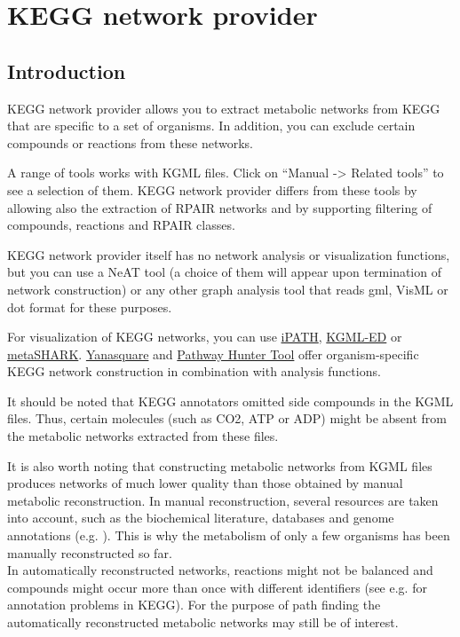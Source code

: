 \chapter{KEGG network provider}

\section{Introduction}

KEGG network provider allows you to extract metabolic networks from KEGG \cite{Kanehisa2008} that are specific to a set of organisms.
In addition, you can exclude certain compounds or reactions from these networks.

A range of tools works with KGML files. Click on ``Manual -> Related tools'' to see a selection of them.
KEGG network provider differs from these tools by allowing also the extraction of RPAIR networks and by supporting
filtering of compounds, reactions and RPAIR classes.

KEGG network provider itself has no network analysis or visualization functions,
but you can use a NeAT tool (a choice of them will appear upon termination of network construction)
or any other graph analysis tool that reads gml, VisML or dot format for these purposes.

For visualization of KEGG networks, you can use \href{http://pathways.embl.de/index.html}{iPATH},
\href{http://kgml-ed.ipk-gatersleben.de/Introduction.html}{KGML-ED} or
\href{http://bioinformatics.leeds.ac.uk:8080/shark/user}{metaSHARK}.
\href{http://yana.bioapps.biozentrum.uni-wuerzburg.de/}{Yanasquare} and
\href{http://pht.tu-bs.de/PHT/}{Pathway Hunter Tool} offer
organism-specific KEGG network construction in combination
with analysis functions.

It should be noted that KEGG annotators omitted side compounds in the KGML files. Thus, certain molecules
(such as CO2, ATP or ADP) might be absent from the metabolic networks extracted from these files.

It is also worth noting that constructing metabolic networks from KGML files produces networks of much lower quality
than those obtained by manual metabolic reconstruction. In manual reconstruction, several resources are taken into account,
such as the biochemical literature, databases and genome annotations (e.g. \cite{Foerster2003}). This is why
the metabolism of only a few organisms has been manually reconstructed so far.\\
In automatically reconstructed networks, reactions might not be balanced and compounds might occur more
than once with different identifiers (see e.g. \cite{Poolman2006} for annotation problems in KEGG).
For the purpose of path finding the automatically reconstructed metabolic networks may still be of interest.

